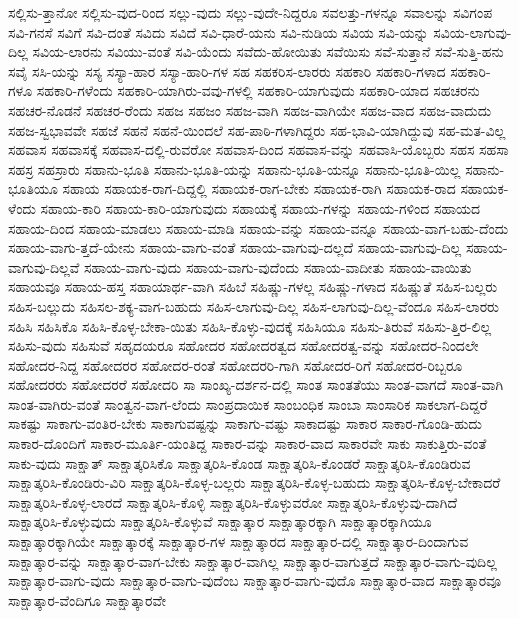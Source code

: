 {ಸಲ್ಲಿಸು-ತ್ತಾನೋ
ಸಲ್ಲಿಸು-ವುದ-ರಿಂದ
ಸಲ್ಲು-ವುದು
ಸಲ್ಲು-ವುದೇ-ನಿದ್ದರೂ
ಸವಲತ್ತು-ಗಳನ್ನೂ
ಸವಾಲನ್ನು
ಸವಿಗಂಪ
ಸವಿ-ಗನಸೆ
ಸವಿಗೆ
ಸವಿ-ದಂತೆ
ಸವಿದು
ಸವಿದೆ
ಸವಿ-ಧಾರೆ-ಯನು
ಸವಿ-ನುಡಿಯ
ಸವಿಯ
ಸವಿ-ಯನ್ನು
ಸವಿಯ-ಲಾಗುವು-ದಿಲ್ಲ
ಸವಿಯ-ಲಾರನು
ಸವಿಯು-ವಂತೆ
ಸವಿ-ಯೆಂದು
ಸವೆದು-ಹೋಯಿತು
ಸವೆಯಿಸು
ಸವೆ-ಸುತ್ತಾನೆ
ಸವೆ-ಸುತ್ತಿ-ಹನು
ಸವೈ
ಸಸಿ-ಯನ್ನು
ಸಸ್ಯ
ಸಸ್ಯಾ-ಹಾರ
ಸಸ್ಯಾ-ಹಾರಿ-ಗಳ
ಸಹ
ಸಹಕರಿಸ-ಲಾರರು
ಸಹಕಾರಿ
ಸಹಕಾರಿ-ಗಳಾದ
ಸಹಕಾರಿ-ಗಳೂ
ಸಹಕಾರಿ-ಗಳೆಂದು
ಸಹಕಾರಿ-ಯಾಗಿರು-ವವು-ಗಳಲ್ಲಿ
ಸಹಕಾರಿ-ಯಾಗುವುದು
ಸಹಕಾರಿ-ಯಾದ
ಸಹಚರನು
ಸಹಚರ-ನೊಡನೆ
ಸಹಚರ-ರೆಂದು
ಸಹಜ
ಸಹಜಂ
ಸಹಜ-ವಾಗಿ
ಸಹಜ-ವಾಗಿಯೇ
ಸಹಜ-ವಾದ
ಸಹಜ-ವಾದುದು
ಸಹಜ-ಸ್ವಭಾವವೇ
ಸಹಜೆ
ಸಹನೆ
ಸಹನೆ-ಯಿಂದಲೆ
ಸಹ-ಪಾಠಿ-ಗಳಾಗಿದ್ದರು
ಸಹ-ಭಾವಿ-ಯಾಗಿದ್ದುವು
ಸಹ-ಮತ-ವಿಲ್ಲ
ಸಹವಾಸ
ಸಹವಾಸಕ್ಕೆ
ಸಹವಾಸ-ದಲ್ಲಿ-ರುವರೋ
ಸಹವಾಸ-ದಿಂದ
ಸಹವಾಸ-ವನ್ನು
ಸಹವಾಸಿ-ಯೊಬ್ಬರು
ಸಹಸ
ಸಹಸಾ
ಸಹಸ್ರ
ಸಹಸ್ರಾರು
ಸಹಾನು-ಭೂತಿ
ಸಹಾನು-ಭೂತಿ-ಯನ್ನು
ಸಹಾನು-ಭೂತಿ-ಯನ್ನೂ
ಸಹಾನು-ಭೂತಿ-ಯಿಲ್ಲ
ಸಹಾನು-ಭೂತಿಯೂ
ಸಹಾಯ
ಸಹಾಯಕ-ರಾಗ-ದಿದ್ದಲ್ಲಿ
ಸಹಾಯಕ-ರಾಗ-ಬೇಕು
ಸಹಾಯಕ-ರಾಗಿ
ಸಹಾಯಕ-ರಾದ
ಸಹಾಯಕ-ಳೆಂದು
ಸಹಾಯ-ಕಾರಿ
ಸಹಾಯ-ಕಾರಿ-ಯಾಗುವುದು
ಸಹಾಯಕ್ಕೆ
ಸಹಾಯ-ಗಳನ್ನು
ಸಹಾಯ-ಗಳಿಂದ
ಸಹಾಯದ
ಸಹಾಯ-ದಿಂದ
ಸಹಾಯ-ಮಾಡಲು
ಸಹಾಯ-ಮಾಡಿ
ಸಹಾಯ-ವನ್ನು
ಸಹಾಯ-ವನ್ನೂ
ಸಹಾಯ-ವಾಗ-ಬಹು-ದೆಂದು
ಸಹಾಯ-ವಾಗು-ತ್ತದೆ-ಯೇನು
ಸಹಾಯ-ವಾಗು-ವಂತೆ
ಸಹಾಯ-ವಾಗುವು-ದಲ್ಲದೆ
ಸಹಾಯ-ವಾಗುವು-ದಿಲ್ಲ
ಸಹಾಯ-ವಾಗುವು-ದಿಲ್ಲವೆ
ಸಹಾಯ-ವಾಗು-ವುದು
ಸಹಾಯ-ವಾಗು-ವುದೆಂದು
ಸಹಾಯ-ವಾದೀತು
ಸಹಾಯ-ವಾಯಿತು
ಸಹಾಯವೂ
ಸಹಾಯ-ಹಸ್ತ
ಸಹಾಯಾರ್ಥ-ವಾಗಿ
ಸಹಿಬೆ
ಸಹಿಷ್ಣು-ಗಳಲ್ಲ
ಸಹಿಷ್ಣು-ಗಳಾದ
ಸಹಿಷ್ಣುತೆ
ಸಹಿಸ-ಬಲ್ಲರು
ಸಹಿಸ-ಬಲ್ಲುದು
ಸಹಿಸಲ-ಶಕ್ಯ-ವಾಗ-ಬಹುದು
ಸಹಿಸ-ಲಾಗುವು-ದಿಲ್ಲ
ಸಹಿಸ-ಲಾಗುವು-ದಿಲ್ಲ-ವೆಂದೂ
ಸಹಿಸ-ಲಾರರು
ಸಹಿಸಿ
ಸಹಿಸಿಕೊ
ಸಹಿಸಿ-ಕೊಳ್ಳ-ಬೇಕಾ-ಯಿತು
ಸಹಿಸಿ-ಕೊಳ್ಳು-ವುದಕ್ಕೆ
ಸಹಿಸಿಯೂ
ಸಹಿಸು-ತಿರುವೆ
ಸಹಿಸು-ತ್ತಿರ-ಲಿಲ್ಲ
ಸಹಿಸು-ವುದು
ಸಹಿಸುವೆ
ಸಹೃದಯರೂ
ಸಹೋದರ
ಸಹೋದರತ್ವದ
ಸಹೋದರತ್ವ-ವನ್ನು
ಸಹೋದರ-ನಿಂದಲೇ
ಸಹೋದರ-ನಿದ್ದ
ಸಹೋದರರ
ಸಹೋದರ-ರಂತೆ
ಸಹೋದರರಿ-ಗಾಗಿ
ಸಹೋದರ-ರಿಗೆ
ಸಹೋದರ-ರಿಬ್ಬರೂ
ಸಹೋದರರು
ಸಹೋದರರೆ
ಸಹೋದರಿ
ಸಾ
ಸಾಂಖ್ಯ-ದರ್ಶನ-ದಲ್ಲಿ
ಸಾಂತ
ಸಾಂತತೆಯು
ಸಾಂತ-ವಾಗದೆ
ಸಾಂತ-ವಾಗಿ
ಸಾಂತ-ವಾಗಿರು-ವಂತೆ
ಸಾಂತ್ವನ-ವಾಗ-ಲೆಂದು
ಸಾಂಪ್ರದಾಯಿಕ
ಸಾಂಬಂಧಿಕ
ಸಾಂಬಾ
ಸಾಂಸಾರಿಕ
ಸಾಕಲಾಗ-ದಿದ್ದರೆ
ಸಾಕಷ್ಟು
ಸಾಕಾಗು-ವಂತಿರ-ಬೇಕು
ಸಾಕಾಗುವಷ್ಟನ್ನು
ಸಾಕಾಗು-ವಷ್ಟು
ಸಾಕಾದಷ್ಟು
ಸಾಕಾರ
ಸಾಕಾರ-ಗೊಂಡಿ-ಹುದು
ಸಾಕಾರ-ದೊಂದಿಗೆ
ಸಾಕಾರ-ಮೂರ್ತಿ-ಯಂತಿದ್ದ
ಸಾಕಾರ-ವನ್ನು
ಸಾಕಾರ-ವಾದ
ಸಾಕಾರವೇ
ಸಾಕು
ಸಾಕುತ್ತಿರು-ವಂತೆ
ಸಾಕು-ವುದು
ಸಾಕ್ಷಾತ್
ಸಾಕ್ಷಾತ್ಕರಿಸಿಕೊ
ಸಾಕ್ಷಾತ್ಕರಿಸಿ-ಕೊಂಡ
ಸಾಕ್ಷಾತ್ಕರಿಸಿ-ಕೊಂಡರೆ
ಸಾಕ್ಷಾತ್ಕರಿಸಿ-ಕೊಂಡಿರುವ
ಸಾಕ್ಷಾತ್ಕರಿಸಿ-ಕೊಂಡಿರು-ವಿರಿ
ಸಾಕ್ಷಾತ್ಕರಿಸಿ-ಕೊಳ್ಳ-ಬಲ್ಲರು
ಸಾಕ್ಷಾತ್ಕರಿಸಿ-ಕೊಳ್ಳ-ಬಹುದು
ಸಾಕ್ಷಾತ್ಕರಿಸಿ-ಕೊಳ್ಳ-ಬೇಕಾದರೆ
ಸಾಕ್ಷಾತ್ಕರಿಸಿ-ಕೊಳ್ಳ-ಲಾರದೆ
ಸಾಕ್ಷಾತ್ಕರಿಸಿ-ಕೊಳ್ಳಿ
ಸಾಕ್ಷಾತ್ಕರಿಸಿ-ಕೊಳ್ಳುವರೋ
ಸಾಕ್ಷಾತ್ಕರಿಸಿ-ಕೊಳ್ಳುವು-ದಾಗಿದೆ
ಸಾಕ್ಷಾತ್ಕರಿಸಿ-ಕೊಳ್ಳುವುದು
ಸಾಕ್ಷಾತ್ಕರಿಸಿ-ಕೊಳ್ಳುವೆ
ಸಾಕ್ಷಾತ್ಕಾರ
ಸಾಕ್ಷಾತ್ಕಾರಕ್ಕಾಗಿ
ಸಾಕ್ಷಾತ್ಕಾರಕ್ಕಾಗಿಯೂ
ಸಾಕ್ಷಾತ್ಕಾರಕ್ಕಾಗಿಯೇ
ಸಾಕ್ಷಾತ್ಕಾರಕ್ಕೆ
ಸಾಕ್ಷಾತ್ಕಾರ-ಗಳ
ಸಾಕ್ಷಾತ್ಕಾರದ
ಸಾಕ್ಷಾತ್ಕಾರ-ದಲ್ಲಿ
ಸಾಕ್ಷಾತ್ಕಾರ-ದಿಂದಾಗುವ
ಸಾಕ್ಷಾತ್ಕಾರ-ವನ್ನು
ಸಾಕ್ಷಾತ್ಕಾರ-ವಾಗ-ಬೇಕು
ಸಾಕ್ಷಾತ್ಕಾರ-ವಾಗಿಲ್ಲ
ಸಾಕ್ಷಾತ್ಕಾರ-ವಾಗುತ್ತದೆ
ಸಾಕ್ಷಾತ್ಕಾರ-ವಾಗು-ವುದಿಲ್ಲ
ಸಾಕ್ಷಾತ್ಕಾರ-ವಾಗು-ವುದು
ಸಾಕ್ಷಾತ್ಕಾರ-ವಾಗು-ವುದೆಂಬ
ಸಾಕ್ಷಾತ್ಕಾರ-ವಾಗು-ವುದೊ
ಸಾಕ್ಷಾತ್ಕಾರ-ವಾದ
ಸಾಕ್ಷಾತ್ಕಾರವೂ
ಸಾಕ್ಷಾತ್ಕಾರ-ವೆಂದಿಗೂ
ಸಾಕ್ಷಾತ್ಕಾರವೇ
}
